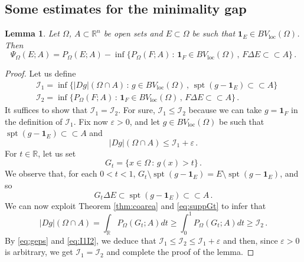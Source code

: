 \documentclass[a4paper,reqno,11pt]{amsart}
\newtheorem{lemma}[theorem]{Lemma}
\newcommand{\R}{\mathbb{R}}
\newcommand{\e}{\varepsilon}
\newcommand{\spt}{\mathop{\mathrm{spt}}}
\newcommand{\loc}{\mathop{\mathrm{loc}}}
\newcommand{\difsim}{\Delta}
\newcommand{\ch}{\mathbf{1}}
\newcommand{\cI}{\mathcal{I}}
\renewcommand{\Subset}{\subset\!\subset}
\newcommand{\pr}{P_{\Omega}}
\begin{document}
\subsection{Some estimates for the minimality gap}
\begin{lemma} \label{lem:eqgaps}
Let $\Omega$, $A \subset \R^{n}$ be open sets and $E \subset \Omega$ be such that $\ch_E \in BV_{\loc}(\Omega)$. Then
\begin{equation*}
\Psi_{\Omega}(E;A) = \pr(E;A) - \inf\big\{ \pr(F;A) \, : \, \ch_{F} \in BV_{\loc}(\Omega) \, , \, F \difsim E \Subset A \big\} \, .
\end{equation*}
\end{lemma}
	\begin{proof}
		Let us define
		\begin{align*}
			& \cI_{1} = \inf \{ |Dg|(\Omega \cap A) \, : \, g \in BV_{\loc}(\Omega) \, , \, \spt(g - \ch_{E}) \Subset A \} \\
			& \cI_{2} = \inf \{ \pr(F;A) \, : \, \ch_{F} \in BV_{\loc}(\Omega) \, , \, F \difsim E \Subset A  \} \, .
		\end{align*}
		It suffices to show that $\cI_{1} = \cI_{2}$. For sure, $\cI_{1} \leq \cI_{2}$ because we can take $g = \ch_{F}$ in the definition of $\cI_{1}$. Fix now $\e > 0$, and let $g \in BV_{\loc}(\Omega)$ be such that $\spt(g - \ch_{E}) \subset \subset A$ and
		\begin{equation} \label{eq:geps}
			|Dg|(\Omega \cap A) \leq \cI_{1} + \e \, . 
		\end{equation}
		For $t \in \R$, let us set
		\begin{equation*}
			G_{t} = \{ x \in \Omega \, : \, g(x) > t \} \, .
		\end{equation*}
		We observe that, for each $0 < t < 1$, $G_{t} \setminus \spt(g - \ch_{E}) = E \setminus \spt(g - \ch_{E})$, and so
		\begin{equation} \label{eq:suppGt}
			G_{t} \difsim E \subset \spt(g - \ch_{E}) \subset \subset A \, .
		\end{equation}
		We can now exploit Theorem \ref{thm:coarea} and \eqref{eq:suppGt} to infer that
		\begin{equation} \label{eq:I1I2}
			|Dg|(\Omega \cap A) = \int_{\R} \pr(G_{t};A) dt \geq \int_{0}^{1} \pr(G_{t};A) dt \geq \cI_{2} \, .
		\end{equation}
		By \eqref{eq:geps} and \eqref{eq:I1I2}, we deduce that $\cI_1 \leq \cI_{2} \leq \cI_{1} + \e$ and then, since $\e>0$ is arbitrary, we get $\cI_{1} = \cI_{2}$ and complete the proof of the lemma.
\end{proof}
\end{document}
